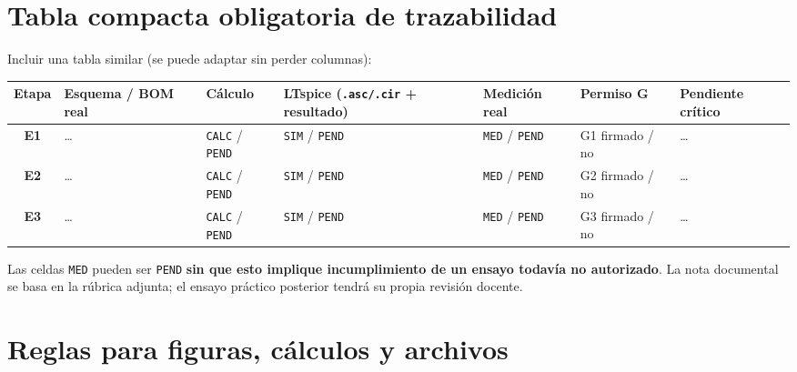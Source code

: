 \documentclass[10pt, a4paper]{article}
\newcommand{\evtag}[1]{\texttt{#1}}
\begin{document}
\section{Tabla compacta obligatoria de trazabilidad}

Incluir una tabla similar (se puede adaptar sin perder columnas):

\begingroup
\scriptsize
\setlength{\tabcolsep}{3.5pt}
\renewcommand{\arraystretch}{1.40}
\noindent\begin{tabularx}{\textwidth}{|c|>{\hsize=0.95\hsize\raggedright\arraybackslash}X|>{\hsize=0.80\hsize\raggedright\arraybackslash}X|>{\hsize=1.15\hsize\raggedright\arraybackslash}X|>{\hsize=0.85\hsize\raggedright\arraybackslash}X|>{\hsize=1.00\hsize\raggedright\arraybackslash}X|>{\hsize=1.25\hsize\raggedright\arraybackslash}X|}
\hline
\rowcolor{ucbblue!15}
\textbf{Etapa} & \textbf{Esquema / BOM real} & \textbf{Cálculo} & \textbf{LTspice (\texttt{.asc/.cir} + resultado)} & \textbf{Medición real} & \textbf{Permiso G} & \textbf{Pendiente crítico} \\ \hline
\textbf{E1} & \ldots & \evtag{CALC} / \evtag{PEND} & \evtag{SIM} / \evtag{PEND} & \evtag{MED} / \evtag{PEND} & G1 firmado / no & \ldots \\ \hline
\textbf{E2} & \ldots & \evtag{CALC} / \evtag{PEND} & \evtag{SIM} / \evtag{PEND} & \evtag{MED} / \evtag{PEND} & G2 firmado / no & \ldots \\ \hline
\textbf{E3} & \ldots & \evtag{CALC} / \evtag{PEND} & \evtag{SIM} / \evtag{PEND} & \evtag{MED} / \evtag{PEND} & G3 firmado / no & \ldots \\ \hline
\end{tabularx}
\endgroup

\vspace{2pt}
{\footnotesize Las celdas \evtag{MED} pueden ser \evtag{PEND} \textbf{sin que esto implique incumplimiento de un ensayo todavía no autorizado}. La nota documental se basa en la rúbrica adjunta; el ensayo práctico posterior tendrá su propia revisión docente.}

\section{Reglas para figuras, cálculos y archivos}
\end{document}
